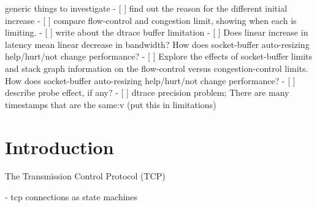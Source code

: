 \documentclass[a4paper,10pt]{article}
\begin{document}
generic things to investigate
- [ ] find out the reason for the different initial increase
- [ ] compare flow-control and congestion limit, showing when each is limiting.
- [ ] write about the dtrace buffer limitation
- [ ] Does linear increase in latency mean linear decrease in bandwidth? How does socket-buffer auto-resizing help/hurt/not change performance?
- [ ] Explore the effects of socket-buffer limits and stack graph information on the flow-control versus congestion-control limits. How does socket-buffer auto-resizing help/hurt/not change performance? 
- [ ] describe probe effect, if any?
- [ ] dtrace precision problem; There are many timestamps that are the same:v (put this in limitations)
\fi

\clearpage

\setcounter{page}{1}

\section{Introduction}

The Transmission Control Protocol (TCP)

- tcp connections as state machines
\end{document}
